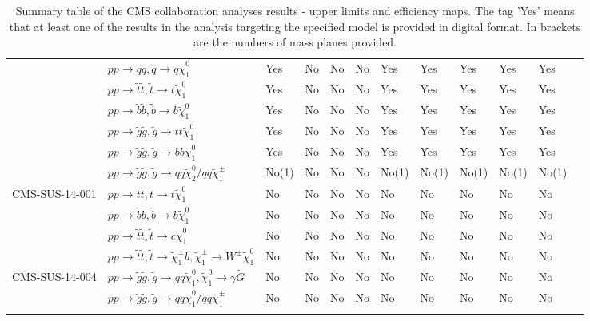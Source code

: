 \documentclass[11pt,A4paper]{article}
\begin{document}
\begin{landscape}
\begin{longtable} {|l|l|l|l|l|l|l|l|l|l|l|l|}
  & $pp \rightarrow \tilde{q} \tilde{q}, \tilde{q}\rightarrow q  \tilde{\chi}_1 ^0 $ & Yes & No & No & No & Yes & Yes & Yes & Yes & Yes & \\
  & $pp \rightarrow \tilde{t} \tilde{t}, \tilde{t}\rightarrow t  \tilde{\chi}_1 ^0 $ & Yes & No & No & No & Yes & Yes & Yes & Yes & Yes & \\
  & $pp \rightarrow \tilde{b} \tilde{b}, \tilde{b}\rightarrow b  \tilde{\chi}_1 ^0 $ & Yes & No & No & No & Yes & Yes & Yes & Yes & Yes & \\
  & $pp \rightarrow \tilde{g} \tilde{g}, \tilde{g}\rightarrow t  t  \tilde{\chi}_1 ^0 $ & Yes & No & No & No & Yes & Yes & Yes & Yes & Yes & \\
  & $pp \rightarrow \tilde{g} \tilde{g}, \tilde{g} \rightarrow b  b \tilde{\chi}_1 ^0 $ & Yes & No & No & No & Yes & Yes & Yes & Yes & Yes & \\
  & $pp \rightarrow \tilde{g} \tilde{g}, \tilde{g} \rightarrow q q \tilde{\chi}_2 ^0 / qq \tilde{\chi}_1 ^{\pm}$ & No(1) & No & No & No & No(1) & No(1) & No(1) & No(1) & No(1) & \\ \hline
CMS-SUS-14-001 & $pp \rightarrow \tilde{t} \tilde{t}, \tilde{t}\rightarrow t  \tilde{\chi}_1 ^0 $ & No & No & No & No & No & No & No & No & No & \\
  & $pp \rightarrow \tilde{b} \tilde{b}, \tilde{b}\rightarrow b  \tilde{\chi}_1 ^0 $ & No & No & No & No & No & No & No & No & No & \\
  & $pp \rightarrow \tilde{t} \tilde{t}, \tilde{t}\rightarrow c  \tilde{\chi}_1 ^0 $ & No & No & No & No & No & No & No & No & No & \\
  & $pp \rightarrow \tilde{t} \tilde{t}, \tilde{t}\rightarrow \tilde{\chi}_1 ^{\pm} b,\tilde{\chi}_1 ^{\pm} \rightarrow W^{\pm} \tilde{\chi}_1 ^0$ & No & No & No & No & No & No & No & No & No & \\ \hline
CMS-SUS-14-004 & $pp \rightarrow \tilde{g} \tilde{g}, \tilde{g}\rightarrow q q \tilde{\chi}_1 ^0  ,\tilde{\chi}_1 ^0 \rightarrow \gamma  \tilde{G}$ & No & No & No & No & No & No & No & No & No & \\
  & $pp \rightarrow \tilde{g} \tilde{g}, \tilde{g}\rightarrow q q \tilde{\chi}_1 ^0  / q q \tilde{\chi}_1 ^{\pm}$ & No & No & No & No & No & No & No & No & No & \\ \hline


\caption{Summary table of the CMS collaboration analyses results - upper limits and efficiency maps. The tag 'Yes' means that at least one of the results in the analysis targeting the specified model is provided in digital format. In brackets are the numbers of mass planes provided.}
\end{longtable} 
\end{landscape}
\end{document}
